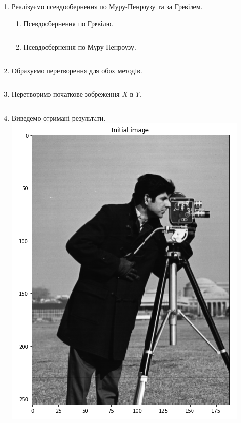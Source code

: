\documentclass[12pt, a4paper]{article}
\begin{document}
\begin{enumerate}
  \item Реалізуємо псевдообернення по Муру-Пенроузу та за Гревілем.
  \begin{enumerate}
    \item Псевдообернення по Гревілю.
    \inputminted[firstline=24, lastline=46]{python}{pseudo-inverse-python.py}
    \pagebreak
    \item Псевдообернення по Муру-Пенроузу.
    \inputminted[firstline=49, lastline=68]{python}{pseudo-inverse-python.py}
  \end{enumerate}
  \item Обрахуємо перетворення для обох методів.
  \inputminted[firstline=71, lastline=81]{python}{pseudo-inverse-python.py}
  \item Перетворимо початкове зобреження $X$ в $Y$.
  \inputminted[firstline=87, lastline=97]{python}{pseudo-inverse-python.py}
  \pagebreak
  \item Виведемо отримані результати. \\
  \includegraphics[scale=0.39]{initial_1.png}

\end{enumerate}
\end{document}
